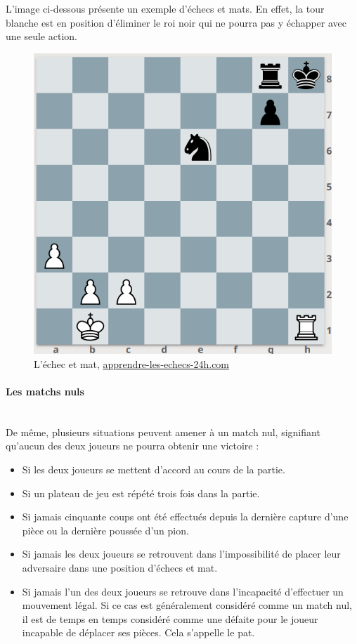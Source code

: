 \documentclass{article}
\begin{document}
L'image ci-dessous présente un exemple d'échecs et mats. En effet, la tour blanche est en position d'éliminer le roi noir qui ne pourra pas y échapper avec une seule action.\newline

\begin{figure}[!h]
\centering
\includegraphics[scale=0.5]{img/echec-et-mat.png}
\caption{L'échec et mat,
\href{https://www.apprendre-les-echecs-24h.com/blog/echec-et-mat/}{apprendre-les-echecs-24h.com}}
\end{figure}

\paragraph{Les matchs nuls}
~~\\

De même, plusieurs situations peuvent amener à un match nul, signifiant qu'aucun des deux joueurs ne pourra obtenir une victoire :

\begin{itemize}
    \item Si les deux joueurs se mettent d'accord au cours de la partie.
    \item Si un plateau de jeu est répété trois fois dans la partie.
    \item Si jamais cinquante coups ont été effectués depuis la dernière capture d'une pièce ou la dernière poussée d'un pion.
    \item Si jamais les deux joueurs se retrouvent dans l'impossibilité de placer leur adversaire dans une position d'échecs et mat.
    \item Si jamais l'un des deux joueurs se retrouve dans l'incapacité d'effectuer un mouvement légal. Si ce cas est généralement considéré comme un match nul, il est de temps en temps considéré comme une défaite pour le joueur incapable de déplacer ses pièces. Cela s'appelle le pat.
\end{itemize}
\end{document}
